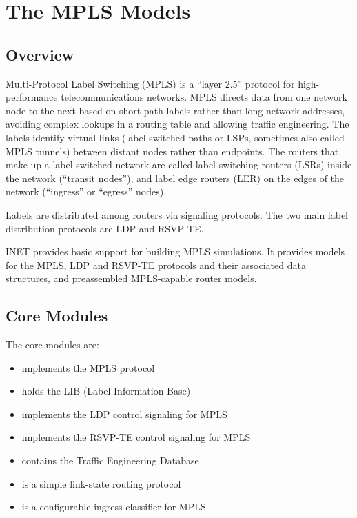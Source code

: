 \chapter{The MPLS Models}
\label{cha:mpls}

\section{Overview}

Multi-Protocol Label Switching (MPLS) is a ``layer 2.5'' protocol for
high-performance telecommunications networks. MPLS directs data from one network
node to the next based on short path labels rather than long network addresses,
avoiding complex lookups in a routing table and allowing traffic engineering.
The labels identify virtual links (label-switched paths or LSPs, sometimes also
called MPLS tunnels) between distant nodes rather than endpoints. The routers
that make up a label-switched network are called label-switching routers (LSRs)
inside the network (``transit nodes''), and label edge routers (LER) on the
edges of the network (``ingress'' or ``egress'' nodes).

Labels are distributed among routers via signaling protocols. The two main
label distribution protocols are LDP and RSVP-TE.

INET provides basic support for building MPLS simulations. It provides models
for the MPLS, LDP and RSVP-TE protocols and their associated data structures,
and preassembled MPLS-capable router models. 

\section{Core Modules}

The core modules are:

\begin{itemize}
  \item {} implements the MPLS protocol 
  \item {} holds the LIB (Label Information Base)
  \item {} implements the LDP control signaling for MPLS 
  \item {} implements the RSVP-TE control signaling for MPLS 
  \item {} contains the Traffic Engineering Database 
  \item {} is a simple link-state routing protocol
  \item {} is a configurable ingress classifier for MPLS
\end{itemize}

